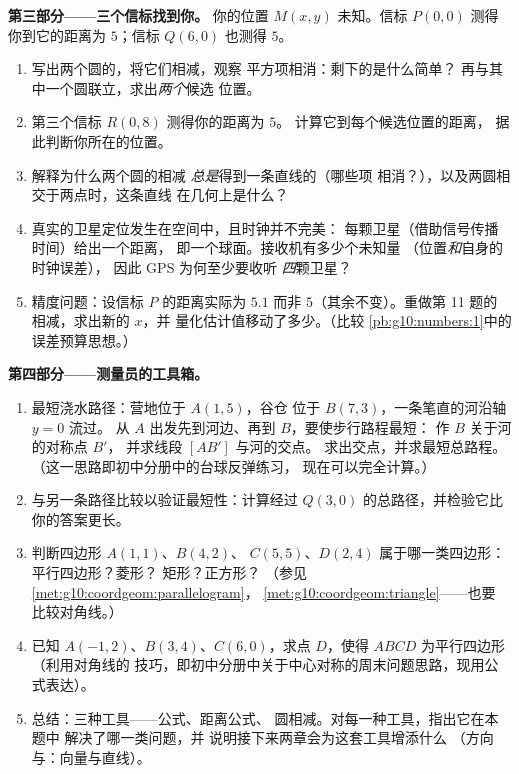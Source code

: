 \begin{problem}
\medskip
\noindent\textbf{第三部分——三个信标找到你。}
你的位置 $M(x, y)$ 未知。信标 $P(0, 0)$ 测得
你到它的距离为 $5$；信标 $Q(6, 0)$ 也测得 $5$。
\begin{enumerate}[resume]
  \item 写出两个圆的，将它们相减，观察
        平方项相消：剩下的是什么简单？
        再与其中一个圆联立，求出\emph{两个}候选
        位置。
  \item 第三个信标 $R(0, 8)$ 测得你的距离为 $5$。
        计算它到每个候选位置的距离，
        据此判断你所在的位置。
  \item 解释为什么两个圆的相减
        \emph{总是}得到一条直线的（哪些项
        相消？），以及两圆相交于两点时，这条直线
        在几何上是什么？
  \item 真实的卫星定位发生在空间中，且时钟并不完美：
        每颗卫星（借助信号传播时间）给出一个距离，
        即一个球面。接收机有多少个未知量
        （位置\emph{和}自身的时钟误差），
        因此 GPS 为何至少要收听
        \emph{四}颗卫星？
  \item 精度问题：设信标 $P$ 的距离实际为
        $5.1$ 而非 $5$（其余不变）。重做第 11 题的
        相减，求出新的 $x$，并
        量化估计值移动了多少。（比较
        \cref{pb:g10:numbers:1}中的误差预算思想。）
\end{enumerate}

\medskip
\noindent\textbf{第四部分——测量员的工具箱。}
\begin{enumerate}[resume]
  \item 最短浇水路径：营地位于 $A(1, 5)$，谷仓
        位于 $B(7, 3)$，一条笔直的河沿轴 $y = 0$ 流过。
        从 $A$ 出发先到河边、再到 $B$，要使步行路程最短：
        作 $B$ 关于河的对称点 $B'$，
        并求线段 $[AB']$ 与河的交点。
        求出交点，并求最短总路程。
        （这一思路即初中分册中的台球反弹练习，
        现在可以完全计算。）
  \item 与另一条路径比较以验证最短性：计算经过
        $Q(3, 0)$ 的总路径，并检验它比你的答案更长。
  \item 判断四边形 $A(1,1)$、$B(4,2)$、
        $C(5,5)$、$D(2,4)$ 属于哪一类四边形：平行四边形？菱形？
        矩形？正方形？
        （参见\cref{met:g10:coordgeom:parallelogram}，
        \cref{met:g10:coordgeom:triangle}——也要
        比较对角线。）
  \item 已知 $A(-1, 2)$、$B(3, 4)$、$C(6, 0)$，求点 $D$，使得
        $ABCD$ 为平行四边形（利用对角线的
        技巧，即初中分册中关于中心对称的周末问题思路，现用公式表达）。
  \item 总结：三种工具——公式、距离公式、
        圆相减。对每一种工具，指出它在本题中
        解决了哪一类问题，并
        说明接下来两章会为这套工具增添什么
        （方向与：向量与直线）。
\end{enumerate}
\end{problem}
